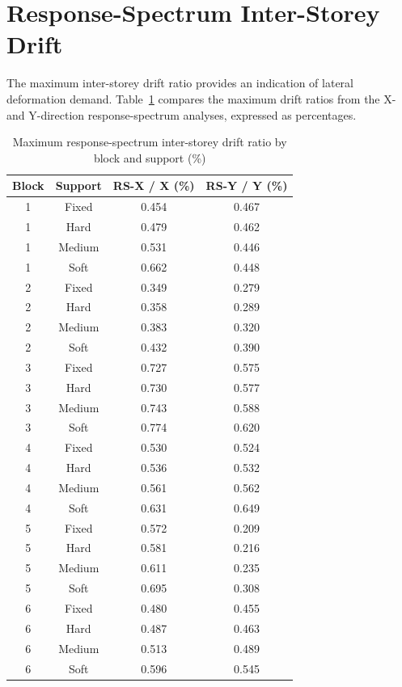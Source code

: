 \section{Response-Spectrum Inter-Storey Drift}

The maximum inter-storey drift ratio provides an indication of lateral deformation demand. Table~\ref{tab:seq54_drift} compares the maximum drift ratios from the X- and Y-direction response-spectrum analyses, expressed as percentages.

\begin{table}[!htbp]
\fontsize{11}{13}\selectfont\setlength{\tabcolsep}{4pt}
\centering
\fontsize{11}{13}\selectfont\setlength{\tabcolsep}{4pt}\renewcommand{\arraystretch}{0.95}
\caption{Maximum response-spectrum inter-storey drift ratio by block and support (\%)}\label{tab:seq54_drift}
\begin{tabular*}{\linewidth}{@{\extracolsep{\fill}}cccc@{}}
\toprule
Block & Support & RS-X / X (\%) & RS-Y / Y (\%)\\
\midrule
1 & Fixed & 0.454 & 0.467 \\
1 & Hard & 0.479 & 0.462 \\
1 & Medium & 0.531 & 0.446 \\
1 & Soft & 0.662 & 0.448 \\
2 & Fixed & 0.349 & 0.279 \\
2 & Hard & 0.358 & 0.289 \\
2 & Medium & 0.383 & 0.320 \\
2 & Soft & 0.432 & 0.390 \\
3 & Fixed & 0.727 & 0.575 \\
3 & Hard & 0.730 & 0.577 \\
3 & Medium & 0.743 & 0.588 \\
3 & Soft & 0.774 & 0.620 \\
4 & Fixed & 0.530 & 0.524 \\
4 & Hard & 0.536 & 0.532 \\
4 & Medium & 0.561 & 0.562 \\
4 & Soft & 0.631 & 0.649 \\
5 & Fixed & 0.572 & 0.209 \\
5 & Hard & 0.581 & 0.216 \\
5 & Medium & 0.611 & 0.235 \\
5 & Soft & 0.695 & 0.308 \\
6 & Fixed & 0.480 & 0.455 \\
6 & Hard & 0.487 & 0.463 \\
6 & Medium & 0.513 & 0.489 \\
6 & Soft & 0.596 & 0.545 \\
\bottomrule
\end{tabular*}
\end{table}


